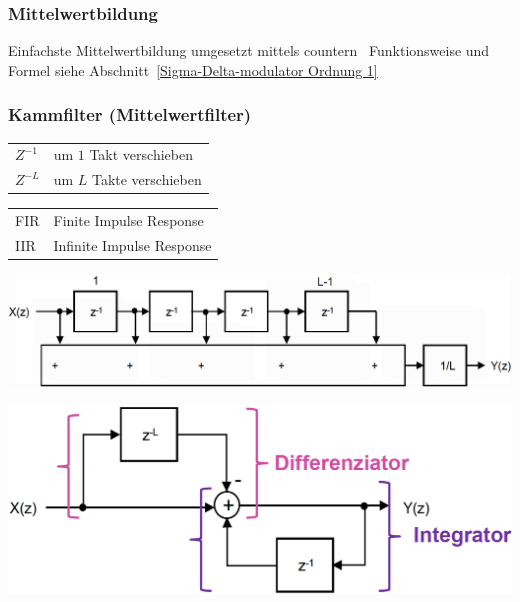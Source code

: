 \subsubsection{Mittelwertbildung}

Einfachste Mittelwertbildung umgesetzt mittels countern \textrightarrow\ Funktionsweise und Formel 
siehe Abschnitt~\ref{Sigma-Delta-modulator Ordnung 1}


\subsubsection{Kammfilter (Mittelwertfilter)}

\begin{minipage}[t]{0.45\columnwidth}
    \begin{tabular}{ll}
        $Z^{-1}$    & um $1$ Takt verschieben \\
        $Z^{-L}$    & um $L$ Takte verschieben \\
    \end{tabular}
\end{minipage}
\hfill
\begin{minipage}[t]{0.52\columnwidth}
    \begin{tabular}{ll}
        FIR    & Finite Impulse Response \\
        IIR    & Infinite Impulse Response \\
    \end{tabular}
\end{minipage}

\vspace{0.2cm}

\begin{minipage}[t]{0.58\columnwidth}
    \begin{center}
    \end{center}
    \includegraphics[width=\columnwidth]{images/kammfilter.png}
\end{minipage}
\hfill
\begin{minipage}[t]{0.38\columnwidth}
    \begin{center}
    \end{center}
    \includegraphics[width=\columnwidth]{images/kammfilter_IIR-filter.png}
\end{minipage}

